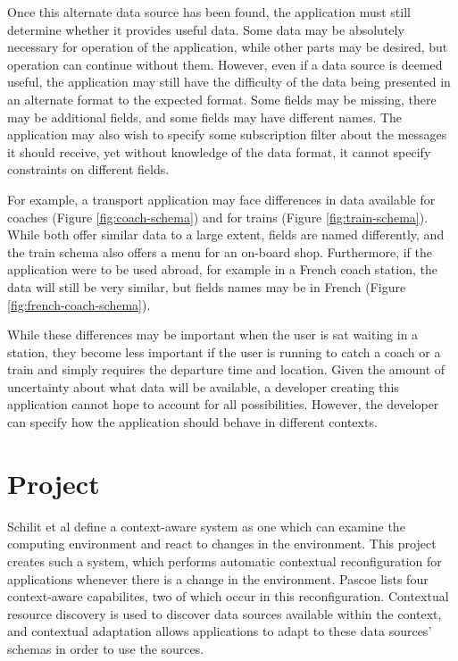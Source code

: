 \documentclass[12pt,twoside,notitlepage]{report}
\begin{document}
Once this alternate data source has been found, the application must still determine whether it provides useful data. 
Some data may be absolutely necessary for operation of the application, while other parts may be desired, but operation can continue without them. 
However, even if a data source is deemed useful, the application may still have the difficulty of the data being presented in an alternate format to the expected format. 
Some fields may be missing, there may be additional fields, and some fields may have different names. 
The application may also wish to specify some subscription filter about the messages it should receive, yet without knowledge of the data format, it cannot specify constraints on different fields.

For example, a transport application may face differences in data available for coaches (Figure \ref{fig:coach-schema}) and for trains (Figure \ref{fig:train-schema}). 
While both offer similar data to a large extent, fields are named differently, and the train schema also offers a menu for an on-board shop.
Furthermore, if the application were to be used abroad, for example in a French coach station, the data will still be very similar, but fields names may be in French (Figure \ref{fig:french-coach-schema}).

While these differences may be important when the user is sat waiting in a station, they become less important if the user is running to catch a coach or a train and simply requires the departure time and location.
Given the amount of uncertainty about what data will be available, a developer creating this application cannot hope to account for all possibilities. 
However, the developer can specify how the application should behave in different contexts.

\section{Project}

Schilit et al \cite{Schilit:1994:CCA:1439278.1440041}  define a context-aware system as one which can examine the computing environment and react to changes in the environment. 
This project creates such a system, which performs automatic contextual reconfiguration for applications whenever there is a change in the environment. 
Pascoe \cite{Pascoe:1998:AGC:857199.858020} lists four context-aware capabilites, two of which occur in this reconfiguration. 
Contextual resource discovery is used to discover data sources available within the context, and contextual adaptation allows applications to adapt to these data sources' schemas in order to use the sources.
\end{document}
